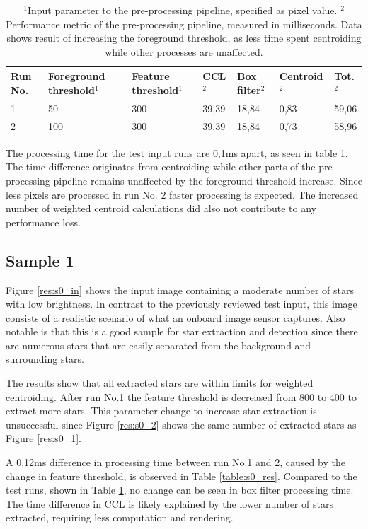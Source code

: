\documentclass[12pt]{report}
\begin{document}
\begin{table}[!h]
    \centering
    \begin{tabular}{|p{0.8cm}|p{2.5cm}|p{2cm}||p{1.25cm}|p{1.25cm}|p{1.8cm}|p{1cm}|}
        \hline
        \textbf{Run No.}&\textbf{Foreground threshold$^{1}$}&\textbf{Feature threshold$^{1}$}&\textbf{CCL$^{2}$}&\textbf{Box filter$^{2}$}&\textbf{Centroid$^{2}$}&\textbf{Tot.$^{2}$}\\
        \hline
        \hline
        1&50&300&39,39&18,84&0,83&59,06\\
        \hline
        2&100&300&39,39&18,84&0,73&58,96\\
        \hline
    \end{tabular}
    \caption{$^{1}$Input parameter to the pre-processing pipeline, specified as pixel value. $^{2}$Performance metric of the pre-processing pipeline, measured in milliseconds. Data shows result of increasing the foreground threshold, as less time spent centroiding while other processes are unaffected.}
    \label{table:t_res}
\end{table}

The processing time for the test input runs are 0,1ms apart, as seen in table \ref{table:t_res}. The time difference originates from centroiding while other parts of the pre-processing pipeline remains unaffected by the foreground threshold increase. Since less pixels are processed in run No. 2 faster processing is expected. The increased number of weighted centroid calculations did also not contribute to any performance loss.

\subsection*{Sample 1}

Figure \ref{res:s0_in} shows the input image containing a moderate number of stars with low brightness. In contrast to the previously reviewed test input, this image consists of a realistic scenario of what an onboard image sensor captures. Also notable is that this is a good sample for star extraction and detection since there are numerous stars that are easily separated from the background and surrounding stars.
\par
The results show that all extracted stars are within limits for weighted centroiding. After run No.1 the feature threshold is decreased from 800 to 400 to extract more stars. This parameter change to increase star extraction is unsuccessful since Figure \ref{res:s0_2} shows the same number of extracted stars as Figure \ref{res:s0_1}.  
\par
A 0,12ms difference in processing time between run No.1 and 2, caused by the change in feature threshold, is observed in Table \ref{table:s0_res}. Compared to the test runs, shown in Table \ref{table:t_res}, no change can be seen in box filter processing time. The time difference in CCL is likely explained by the lower number of stars extracted, requiring less computation and rendering.
\end{document}
